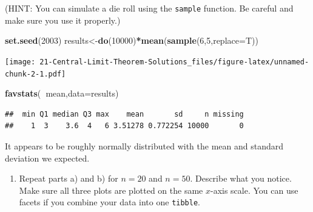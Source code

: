 \documentclass[
]{book}
\newenvironment{Shaded}{\begin{snugshade}}{\end{snugshade}}
\newcommand{\DataTypeTok}[1]{\textcolor[rgb]{0.13,0.29,0.53}{#1}}
\newcommand{\DecValTok}[1]{\textcolor[rgb]{0.00,0.00,0.81}{#1}}
\newcommand{\KeywordTok}[1]{\textcolor[rgb]{0.13,0.29,0.53}{\textbf{#1}}}
\newcommand{\NormalTok}[1]{#1}
\newcommand{\OperatorTok}[1]{\textcolor[rgb]{0.81,0.36,0.00}{\textbf{#1}}}
\newcommand{\StringTok}[1]{\textcolor[rgb]{0.31,0.60,0.02}{#1}}
\providecommand{\tightlist}{%
  \setlength{\itemsep}{0pt}\setlength{\parskip}{0pt}}
\begin{document}
(HINT: You can simulate a die roll using the \texttt{sample} function. Be careful and make sure you use it properly.)

\begin{Shaded}
\begin{Highlighting}[]
\KeywordTok{set.seed}\NormalTok{(}\DecValTok{2003}\NormalTok{)}
\NormalTok{results<-}\KeywordTok{do}\NormalTok{(}\DecValTok{10000}\NormalTok{)}\OperatorTok{*}\KeywordTok{mean}\NormalTok{(}\KeywordTok{sample}\NormalTok{(}\DecValTok{6}\NormalTok{,}\DecValTok{5}\NormalTok{,}\DataTypeTok{replace=}\NormalTok{T))}
\end{Highlighting}
\end{Shaded}

\begin{Shaded}
\end{Shaded}

\texttt{[image: 21-Central-Limit-Theorem-Solutions\_files/figure-latex/unnamed-chunk-2-1.pdf]}

\begin{Shaded}
\begin{Highlighting}[]
\KeywordTok{favstats}\NormalTok{(}\OperatorTok{~}\NormalTok{mean,}\DataTypeTok{data=}\NormalTok{results)}
\end{Highlighting}
\end{Shaded}

\begin{verbatim}
##  min Q1 median Q3 max    mean       sd     n missing
##    1  3    3.6  4   6 3.51278 0.772254 10000       0
\end{verbatim}

It appears to be roughly normally distributed with the mean and standard deviation we expected.

\begin{enumerate}
\def\labelenumi{\alph{enumi}.}
\setcounter{enumi}{2}
\tightlist
\item
  Repeat parts a) and b) for \(n=20\) and \(n=50\). Describe what you notice. Make sure all three plots are plotted on the same \(x\)-axis scale. You can use facets if you combine your data into one \texttt{tibble}.
\end{enumerate}
\end{document}
